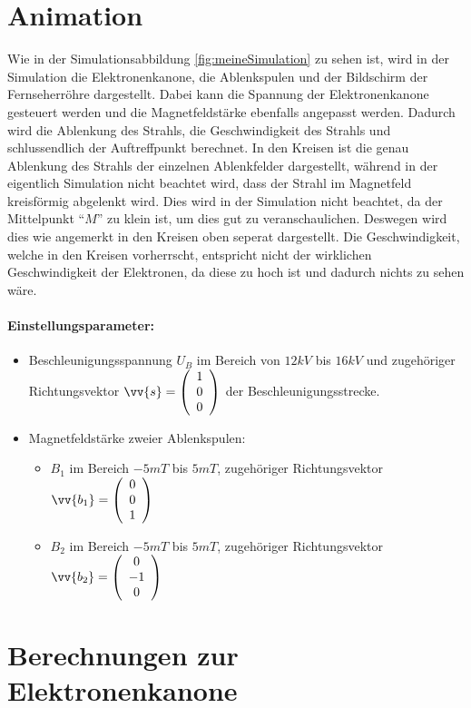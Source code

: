 \section{Animation}
Wie in der Simulationsabbildung \ref{fig:meineSimulation} zu sehen ist, wird in der Simulation die Elektronenkanone, die Ablenkspulen und der Bildschirm der Fernseherröhre dargestellt. 
Dabei kann die Spannung der Elektronenkanone gesteuert werden und die Magnetfeldstärke ebenfalls angepasst werden.
Dadurch wird die Ablenkung des Strahls, die Geschwindigkeit des Strahls und schlussendlich der Auftreffpunkt berechnet.
In den Kreisen ist die genau Ablenkung des Strahls der einzelnen Ablenkfelder dargestellt, während in der eigentlich Simulation nicht beachtet wird, dass der Strahl im Magnetfeld kreisförmig abgelenkt wird.
Dies wird in der Simulation nicht beachtet, da der Mittelpunkt "`$M$"' zu klein ist, um dies gut zu veranschaulichen.
Deswegen wird dies wie angemerkt in den Kreisen oben seperat dargestellt.
Die Geschwindigkeit, welche in den Kreisen vorherrscht, entspricht nicht der wirklichen Geschwindigkeit der Elektronen, da diese zu hoch ist und dadurch nichts zu sehen wäre.
\label{sec:animation}
\paragraph{Einstellungsparameter:}

\begin{itemize}
    \item Beschleunigungsspannung $U_B$ im Bereich von $12 kV$ bis $16 kV$ und  zugehöriger Richtungsvektor $\vv{s} = \vektor{1}{0}{0}$ der Beschleunigungsstrecke.
    \item Magnetfeldstärke zweier Ablenkspulen:
    
    \begin{itemize}
        \item $B_1$ im Bereich $-5 mT$ bis $5 mT$, zugehöriger Richtungsvektor $\vv{b_1} = \vektor{0}{0}{1}$ %
        \item $B_2$ im Bereich $-5 mT$ bis $5 mT$, zugehöriger Richtungsvektor $\vv{b_2} = \vektor{0}{-1}{0}$ %
    \end{itemize}

\end{itemize}


\section{Berechnungen zur Elektronenkanone}

